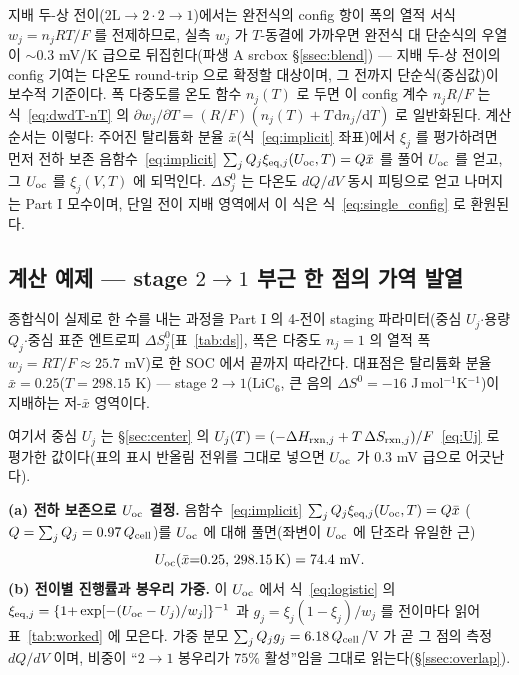 지배 두-상 전이($2\mathrm L\!\to\!2\cdot2\!\to\!1$)에서는 완전식의 config 항이 폭의 열적 서식 $w_j=n_jRT/F$ 를
전제하므로, 실측 $w_j$ 가 $T$-동결에 가까우면 완전식 대 단순식의 우열이 $\sim$0.3 mV/K 급으로 뒤집힌다(파생 A
srcbox \S\ref{ssec:blend}) --- 지배 두-상 전이의 config 기여는 다온도 round-trip 으로 확정할 대상이며, 그
전까지 단순식(중심값)이 보수적 기준이다. 폭 다중도를 온도 함수 $n_j(T)$ 로 두면 이 config 계수 $n_jR/F$ 는
식~\eqref{eq:dwdT-nT} 의 $\partial w_j/\partial T=(R/F)(n_j(T)+T\,\mathrm{d}n_j/\mathrm{d}T)$ 로 일반화된다.
계산 순서는 이렇다: 주어진 탈리튬화 분율 $\bar x$(식~\eqref{eq:implicit} 좌표)에서 $\xi_j$ 를 평가하려면 먼저
전하 보존 음함수~\eqref{eq:implicit} $\sum_j Q_j\xi_{\mathrm{eq},j}(U_{\mathrm{oc}},T)=Q\bar x$ 를 풀어 $U_{\mathrm{oc}}$ 를 얻고, 그
$U_{\mathrm{oc}}$ 를 $\xi_j(V,T)$ 에 되먹인다. $\Delta S^0_j$ 는 다온도 $dQ/dV$ 동시 피팅으로 얻고 나머지는 Part I
모수이며, 단일 전이 지배 영역에서 이 식은 식~\eqref{eq:single_config} 로 환원된다.

\subsection{계산 예제 --- stage $2\!\to\!1$ 부근 한 점의 가역 발열}\label{ssec:worked}
종합식이 실제로 한 수를 내는 과정을 Part I 의 4-전이 staging 파라미터(중심 $U_j$$\cdot$용량 $Q_j$$\cdot$중심
표준 엔트로피 $\Delta S^0_j$[표~\ref{tab:ds}], 폭은 다중도 $n_j{=}1$ 의 열적 폭 $w_j{=}RT/F\!\approx\!25.7$ mV)로
한 SOC 에서 끝까지 따라간다. 대표점은 탈리튬화 분율 $\bar x=0.25$($T=298.15$ K) --- stage
$2\!\to\!1$($\mathrm{LiC_6}$, 큰 음의 $\Delta S^0=-16$ J\,mol$^{-1}$K$^{-1}$)이 지배하는 저-$\bar x$ 영역이다.

여기서 중심 $U_j$ 는 \S\ref{sec:center} 의 $U_j(T)=(-\Delta H_{\mathrm{rxn},j}+T\,\Delta S_{\mathrm{rxn},j})/F$~\eqref{eq:Uj} 로 평가한
값이다(표의 표시 반올림 전위를 그대로 넣으면 $U_{\mathrm{oc}}$ 가 $0.3$ mV 급으로 어긋난다).

\textbf{(a) 전하 보존으로 $U_{\mathrm{oc}}$ 결정.} 음함수~\eqref{eq:implicit} $\sum_jQ_j\xi_{\mathrm{eq},j}(U_{\mathrm{oc}},T)=Q\bar x$
($Q=\sum_jQ_j=0.97\,Q_{\mathrm{cell}}$)를 $U_{\mathrm{oc}}$ 에 대해 풀면(좌변이 $U_{\mathrm{oc}}$ 에 단조라 유일한 근)
\begin{equation*}
U_\oc(\bar x{=}0.25,\,298.15\,\mathrm K)=74.4\ \mathrm{mV}.
\end{equation*}
\textbf{(b) 전이별 진행률과 봉우리 가중.} 이 $U_{\mathrm{oc}}$ 에서 식~\eqref{eq:logistic} 의
$\xi_{\mathrm{eq},j}=\{1{+}\exp[-(U_{\mathrm{oc}}-U_j)/w_j]\}^{-1}$ 과 $g_j=\xi_j(1-\xi_j)/w_j$ 를 전이마다 읽어 표~\ref{tab:worked}
에 모은다. 가중 분모 $\sum_jQ_jg_j=6.18\,Q_{\mathrm{cell}}$/V 가 곧 그 점의 측정 $dQ/dV$ 이며, 비중이 ``$2\!\to\!1$
봉우리가 $75\%$ 활성''임을 그대로 읽는다(\S\ref{ssec:overlap}).

